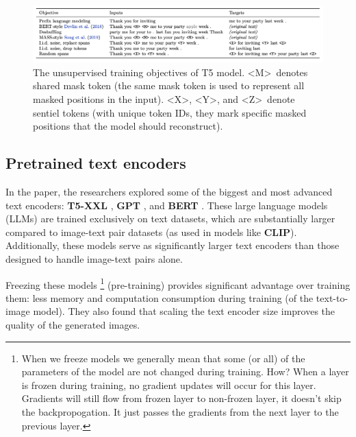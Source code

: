 \begin{figure}[h]
    \centering
    \includegraphics[width=1\textwidth]{images/imagen/t5_objectives.png}
    \caption{The unsupervised training objectives of T5 model. \textless M\textgreater\ denotes shared mask token (the same mask token is used to represent all masked positions in the input). \textless X\textgreater, \textless Y\textgreater, and \textless Z\textgreater\ denote sentiel tokens (with unique token IDs, they mark specific masked positions that the model should reconstruct).}
\end{figure}















\subsection{Pretrained text encoders}

In the paper, the researchers explored some of the biggest and most advanced text encoders: \textbf{T5-XXL} \cite{t5_model}, \textbf{GPT} \cite{gpt} \cite{mingpt} \cite{gpt_another}, and \textbf{BERT} \cite{bert}. These large language models (LLMs) are trained exclusively on text datasets, which are substantially larger compared to image-text pair datasets (as used in models like \textbf{CLIP}). Additionally, these models serve as significantly larger text encoders than those designed to handle image-text pairs alone.

Freezing these models \footnote{When we freeze models we generally mean that some (or all) of the parameters of the model are not changed during training. How? When a layer is frozen during training, no gradient updates will occur for this layer. Gradients will still flow from frozen layer to non-frozen layer, it doesn't skip the backpropogation. It just passes the gradients from the next layer to the previous layer.} (pre-training) provides significant advantage over training them: less memory and computation consumption during training (of the text-to-image model). They also found that scaling the text encoder size improves the quality of the generated images.














